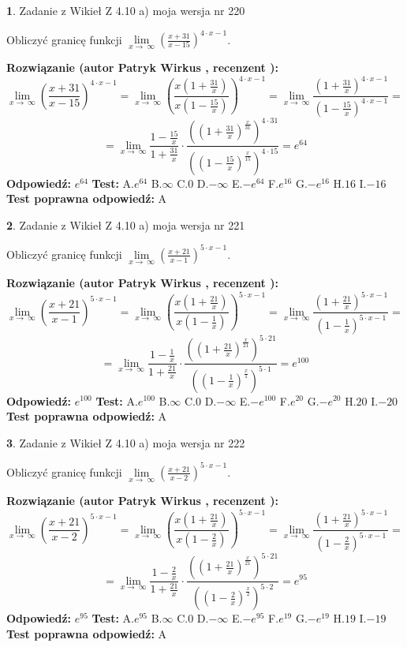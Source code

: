 \documentclass[12pt, a4paper]{article}
\theoremstyle{definition} %
\newtheorem{zad}{}
\newcommand{\zadStart}[1]{\begin{zad}#1\newline}
\newcommand{\zadStop}{\end{zad}}
\newcommand{\rozwStart}[2]{\noindent \textbf{Rozwiązanie (autor #1 , recenzent #2): }\newline}
\newcommand{\rozwStop}{\newline}
\newcommand{\odpStart}{\noindent \textbf{Odpowiedź:}\newline}
\newcommand{\odpStop}{\newline}
\newcommand{\testStart}{\noindent \textbf{Test:}\newline}
\newcommand{\testStop}{\newline}
\newcommand{\kluczStart}{\noindent \textbf{Test poprawna odpowiedź:}\newline}
\newcommand{\kluczStop}{\newline}
\begin{document}
\zadStart{Zadanie z Wikieł Z 4.10 a) moja wersja nr 220}

Obliczyć granicę funkcji  $\lim\limits_{x\to\ \infty}(\frac{x+31}{x-15})^{4\cdot x-1}$.
\zadStop
\rozwStart{Patryk Wirkus}{}
$$\lim\limits_{x\to\ \infty}(\frac{x+31}{x-15})^{4\cdot x-1} = \lim\limits_{x\to\ \infty}(\frac{x(1+\frac{31}{x})}{x(1-\frac{15}{x})})^{4\cdot x-1}=\lim\limits_{x\to\ \infty}\frac{(1+\frac{31}{x})^{4\cdot x-1}}{(1-\frac{15}{x})^{4\cdot x-1}}=$$
$$=\lim\limits_{x\to\ \infty}\frac{1-\frac{15}{x}}{1+\frac{31}{x}}\cdot\frac{((1+\frac{31}{x})^{\frac{x}{31}})^{4\cdot31}}{((1-\frac{15}{x})^{\frac{x}{15}})^{4\cdot15}}=e^{64}$$
\rozwStop
\odpStart
$e^{64}$
\odpStop
\testStart
A.$e^{64}$ B.$\infty$ C.$0$ D.$-\infty$ E.$-e^{64}$
F.$e^{16}$ G.$-e^{16}$
H.$16$
I.$-16$
\testStop
\kluczStart
A
\kluczStop



\zadStart{Zadanie z Wikieł Z 4.10 a) moja wersja nr 221}

Obliczyć granicę funkcji  $\lim\limits_{x\to\ \infty}(\frac{x+21}{x-1})^{5\cdot x-1}$.
\zadStop
\rozwStart{Patryk Wirkus}{}
$$\lim\limits_{x\to\ \infty}(\frac{x+21}{x-1})^{5\cdot x-1} = \lim\limits_{x\to\ \infty}(\frac{x(1+\frac{21}{x})}{x(1-\frac{1}{x})})^{5\cdot x-1}=\lim\limits_{x\to\ \infty}\frac{(1+\frac{21}{x})^{5\cdot x-1}}{(1-\frac{1}{x})^{5\cdot x-1}}=$$
$$=\lim\limits_{x\to\ \infty}\frac{1-\frac{1}{x}}{1+\frac{21}{x}}\cdot\frac{((1+\frac{21}{x})^{\frac{x}{21}})^{5\cdot21}}{((1-\frac{1}{x})^{\frac{x}{1}})^{5\cdot1}}=e^{100}$$
\rozwStop
\odpStart
$e^{100}$
\odpStop
\testStart
A.$e^{100}$ B.$\infty$ C.$0$ D.$-\infty$ E.$-e^{100}$
F.$e^{20}$ G.$-e^{20}$
H.$20$
I.$-20$
\testStop
\kluczStart
A
\kluczStop



\zadStart{Zadanie z Wikieł Z 4.10 a) moja wersja nr 222}

Obliczyć granicę funkcji  $\lim\limits_{x\to\ \infty}(\frac{x+21}{x-2})^{5\cdot x-1}$.
\zadStop
\rozwStart{Patryk Wirkus}{}
$$\lim\limits_{x\to\ \infty}(\frac{x+21}{x-2})^{5\cdot x-1} = \lim\limits_{x\to\ \infty}(\frac{x(1+\frac{21}{x})}{x(1-\frac{2}{x})})^{5\cdot x-1}=\lim\limits_{x\to\ \infty}\frac{(1+\frac{21}{x})^{5\cdot x-1}}{(1-\frac{2}{x})^{5\cdot x-1}}=$$
$$=\lim\limits_{x\to\ \infty}\frac{1-\frac{2}{x}}{1+\frac{21}{x}}\cdot\frac{((1+\frac{21}{x})^{\frac{x}{21}})^{5\cdot21}}{((1-\frac{2}{x})^{\frac{x}{2}})^{5\cdot2}}=e^{95}$$
\rozwStop
\odpStart
$e^{95}$
\odpStop
\testStart
A.$e^{95}$ B.$\infty$ C.$0$ D.$-\infty$ E.$-e^{95}$
F.$e^{19}$ G.$-e^{19}$
H.$19$
I.$-19$
\testStop
\kluczStart
A
\kluczStop
\end{document}
